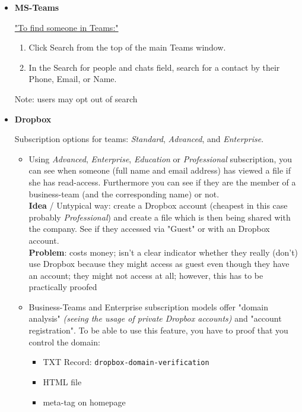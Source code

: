 \documentclass[12pt]{article}
\begin{document}
\begin{itemize}
    
    \item \textbf{MS-Teams}
    
    
    \href{https://support.microsoft.com/en-us/office/find-your-friends-and-family-in-teams-711bfcef-9e40-49d5-8df7-ee071a048c91#ID0EACAAA=Desktop}{"To find someone in Teams:"}
    \begin{enumerate}
        \item Click Search from the top of the main Teams window.
        \item In the Search for people and chats field, search for a contact by their Phone, Email, or Name.
    \end{enumerate}
    Note: users may opt out of search
    
    
    \item \textbf{Dropbox}
    
    Subscription options for teams: \textit{Standard}, \textit{Advanced}, and \textit{Enterprise}.
    
    \begin{itemize}
        \item Using \textit{Advanced}, \textit{Enterprise}, \textit{Education} or \textit{Professional} subscription, you can see when someone (full name and email address) has viewed a file if she has read-access. Furthermore you can see if they are the member of a business-team (and the corresponding name) or not. \\
        \textbf{Idea} / Untypical way: create a Dropbox account (cheapest in this case probably \textit{Professional}) and create a file which is then being shared with the company. See if they accessed via "Guest" or with an Dropbox account. \\
        \textbf{Problem}: costs money; isn't a clear indicator whether they really (don't) use Dropbox because they might access as guest even though they have an account; they might not access at all; however, this has to be practically proofed
        
        \item Business-Teams and Enterprise subscription models offer "domain analysis" \textit{(seeing the usage of private Dropbox accounts)} and "account registration". To be able to use this feature, you have to proof that you control the domain:
        \begin{itemize}
            \item TXT Record: \verb|dropbox-domain-verification|
            \item HTML file
            \item meta-tag on homepage
        \end{itemize}
    \end{itemize}
    

\end{itemize}
\end{document}
